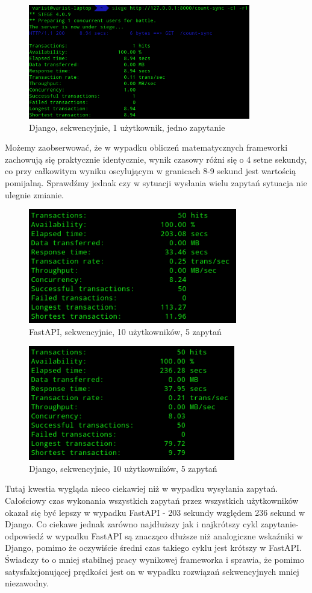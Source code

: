 \begin{figure}[H]
    \includegraphics[height=50mm]{zdjecia/1_math_sync_django}
    \centering
    \caption{Django, sekwencyjnie, 1 użytkownik, jedno zapytanie}
\end{figure}
Możemy zaobserwować, że w wypadku obliczeń matematycznych frameworki zachowują się praktycznie identycznie, wynik czasowy różni się o 4 setne sekundy, co przy całkowitym wyniku oscylującym w granicach 8-9 sekund jest wartością pomijalną. Sprawdźmy jednak czy w sytuacji wysłania wielu zapytań sytuacja nie ulegnie zmianie.
\begin{figure}[H]
    \includegraphics[height=50mm]{zdjecia/10_math_sync_fast}
    \centering
    \caption{FastAPI, sekwencyjnie, 10 użytkowników, 5 zapytań}
\end{figure}

\begin{figure}[H]
    \includegraphics[height=50mm]{zdjecia/10_math_sync_django}
    \centering
    \caption{Django, sekwencyjnie, 10 użytkowników, 5 zapytań}
\end{figure}
Tutaj kwestia wygląda nieco ciekawiej niż w wypadku wysyłania zapytań. Całościowy czas wykonania wszystkich zapytań przez wszystkich użytkowników okazał się być lepszy w wypadku FastAPI - 203 sekundy względem 236 sekund w Django. Co ciekawe jednak zarówno najdłuższy jak i najkrótszy cykl zapytanie-odpowiedź w wypadku FastAPI są znacząco dłuższe niż analogiczne wskaźniki w Django, pomimo że oczywiście średni czas takiego cyklu jest krótszy w FastAPI. Świadczy to o mniej stabilnej pracy wynikowej frameworka i sprawia, że pomimo satysfakcjonującej prędkości jest on w wypadku rozwiązań sekwencyjnych mniej niezawodny.


